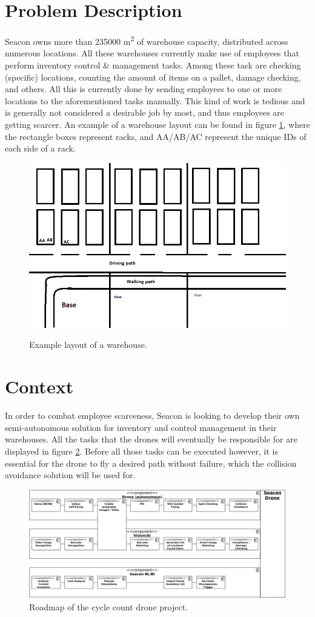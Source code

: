 \section{Problem Description}
Seacon owns more than 235000 m\textsuperscript{2} of warehouse capacity, distributed across numerous locations. All these warehouses currently make use of employees that perform inventory control \& management tasks. Among these task are checking (specific) locations, counting the amount of items on a pallet, damage checking, and others. All this is currently done by sending employees to one or more locations to the aforementioned tasks manually. This kind of work is tedious and is generally not considered a desirable job by most, and thus employees are getting scarcer. An example of a warehouse layout can be found in figure \ref{fig:warehouse_layout}, where the rectangle boxes represent racks, and AA/AB/AC represent the unique IDs of each side of a rack.
\begin{figure}[h]
	\centering
	\includegraphics[width=0.75\linewidth]{img/sketch_warehouse_layout}
	\label{fig:warehouse_layout}
	\caption{Example layout of a warehouse.}
\end{figure}
\pagebreak

\section{Context}
\label{sec:context}
In order to combat employee scarceness, Seacon is looking to develop their own semi-autonomous solution for inventory and control management in their warehouses. All the tasks that the drones will eventually be responsible for are displayed in figure \ref{fig:roadmap}. Before all those tasks can be executed however, it is essential for the drone to fly a desired path without failure, which the collision avoidance solution will be used for.
\begin{figure}[h]
	\centering
	\includegraphics[width=\linewidth]{img/seacon_roadmap.png}
	\caption{Roadmap of the cycle count drone project.}
	\label{fig:roadmap}
\end{figure}

